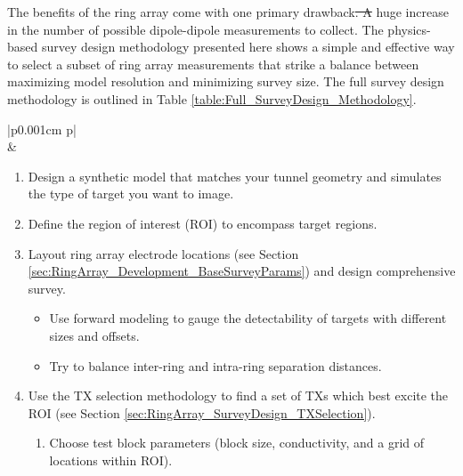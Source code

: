 \documentclass[preprint,authoryear,12pt]{elsarticle}
\providecommand{\DIFaddtex}[1]{{\protect\color{blue}\uwave{#1}}} %
\providecommand{\DIFdeltex}[1]{{\protect\color{red}\sout{#1}}}                      %
\providecommand{\DIFaddbegin}{} %
\providecommand{\DIFaddend}{} %
\providecommand{\DIFdelbegin}{} %
\providecommand{\DIFdelend}{} %
\providecommand{\DIFadd}[1]{\texorpdfstring{\DIFaddtex{#1}}{#1}} %
\providecommand{\DIFdel}[1]{\texorpdfstring{\DIFdeltex{#1}}{}} %
\begin{document}
The benefits of the ring array come with one primary drawback\DIFdelbegin \DIFdel{. A }\DIFdelend \DIFaddbegin \DIFadd{: a }\DIFaddend huge increase in the number of possible dipole-dipole measurements to collect. The physics-based survey design methodology presented here shows a simple and effective way to select a subset of ring array measurements that strike a balance between maximizing model resolution and minimizing survey size. The full survey design methodology is outlined in Table \ref{table:Full_SurveyDesign_Methodology}.

\begin{table}
   \scriptsize
   \begin{tabular} {|p{0.001cm} p{\linewidth}|}
      \hline
       \\
       &
         \begin{enumerate}[leftmargin=*]
            \item Design a synthetic model that matches your tunnel geometry and simulates the type of target you want to image.
            \item Define the region of interest (ROI) to encompass target regions.
            \item Layout ring array electrode locations (see Section \ref{sec:RingArray_Development_BaseSurveyParams}) and design comprehensive survey.
            \begin{itemize}
               \item Use forward modeling to gauge the detectability of targets with different sizes and offsets.
               \item Try to balance inter-ring and intra-ring separation distances.
            \end{itemize}
            \item Use the TX selection methodology to find a set of TXs which best excite the ROI (see Section \ref{sec:RingArray_SurveyDesign_TXSelection}).
               \begin{enumerate}
                  \item Choose test block parameters (block size, conductivity, and a grid of locations within ROI).

\end{enumerate}
\end{enumerate}
\end{tabular}
\end{table}
\end{document}
